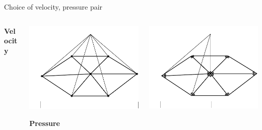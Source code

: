 \documentclass[12pt]{beamer}
\begin{document}
\begin{frame}{Choice of velocity, pressure pair}
\begin{columns}
\begin{column}{0.25\textwidth}
      \bf\centering\tiny Velocity
    \end{column}
    \begin{column}{0.25\textwidth}
      \includegraphics[width=\textwidth,clip,trim=0 20 0 0]{P1cgshapefunction2d_tex}

      \bf\centering\tiny Pressure
    \end{column}
    \begin{column}{0.25\textwidth}
      \includegraphics[width=\textwidth,clip,trim=0 20 0 0]{P1dgshapefunction2d_tex}


\end{column}
\end{columns}
\end{frame}
\end{document}
